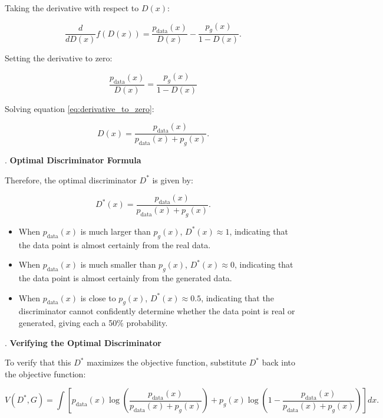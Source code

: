 Taking the derivative with respect to \( D(x) \):

\begin{equation}
    \frac{d}{dD(x)} f(D(x)) = \frac{p_{\text{data}}(x)}{D(x)} - \frac{p_g(x)}{1 - D(x)}.
\end{equation}

Setting the derivative to zero:

\begin{equation}
    \frac{p_{\text{data}}(x)}{D(x)} = \frac{p_g(x)}{1 - D(x)}
    \label{eq:derivative_to_zero}
\end{equation}

Solving equation \eqref{eq:derivative_to_zero}:

\begin{equation}
    D(x) = \frac{p_{\text{data}}(x)}{p_{\text{data}}(x) + p_g(x)}.
\end{equation}

. \textbf{Optimal Discriminator Formula}

Therefore, the optimal discriminator \( D^* \) is given by:

\begin{equation}
    D^*(x) = \frac{p_{\text{data}}(x)}{p_{\text{data}}(x) + p_g(x)}.
\end{equation}


\begin{itemize}
    \item When $p_{\text{data}}(x)$ is much larger than $p_g(x)$, $D^*(x) \approx 1$, indicating that the data point is almost certainly from the real data.
    
    \item When $p_{\text{data}}(x)$ is much smaller than $p_g(x)$, $D^*(x) \approx 0$, indicating that the data point is almost certainly from the generated data.
    
    \item When $p_{\text{data}}(x)$ is close to $p_g(x)$, $D^*(x) \approx 0.5$, indicating that the discriminator cannot confidently determine whether the data point is real or generated, giving each a 50\% probability.
\end{itemize}

. \textbf{Verifying the Optimal Discriminator}

To verify that this \( D^* \) maximizes the objective function, substitute \( D^* \) back into the objective function:

\begin{equation}
    V(D^*, G) = \int \left[ p_{\text{data}}(x) \log \left( \frac{p_{\text{data}}(x)}{p_{\text{data}}(x) + p_g(x)} \right) + p_g(x) \log \left( 1 - \frac{p_{\text{data}}(x)}{p_{\text{data}}(x) + p_g(x)} \right) \right] dx.
\end{equation}

